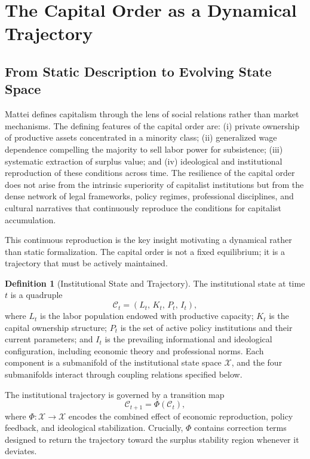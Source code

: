 \documentclass[12pt,a4paper]{article}
\theoremstyle{definition}
\newtheorem{definition}{Definition}[section]
\theoremstyle{remark}
\begin{document}
\section{The Capital Order as a Dynamical Trajectory}
\label{sec:historical}

\subsection{From Static Description to Evolving State Space}

Mattei defines capitalism through the lens of social relations rather than market mechanisms. The defining features of the capital order are: (i) private ownership of productive assets concentrated in a minority class; (ii) generalized wage dependence compelling the majority to sell labor power for subsistence; (iii) systematic extraction of surplus value; and (iv) ideological and institutional reproduction of these conditions across time. The resilience of the capital order does not arise from the intrinsic superiority of capitalist institutions but from the dense network of legal frameworks, policy regimes, professional disciplines, and cultural narratives that continuously reproduce the conditions for capitalist accumulation.

This continuous reproduction is the key insight motivating a dynamical rather than static formalization. The capital order is not a fixed equilibrium; it is a trajectory that must be actively maintained.

\begin{definition}[Institutional State and Trajectory]
The institutional state at time $t$ is a quadruple
\begin{equation}
  \mathcal{C}_t = (L_t,\, K_t,\, P_t,\, I_t),
\end{equation}
where $L_t$ is the labor population endowed with productive capacity; $K_t$ is the capital ownership structure; $P_t$ is the set of active policy institutions and their current parameters; and $I_t$ is the prevailing informational and ideological configuration, including economic theory and professional norms. Each component is a submanifold of the institutional state space $\mathcal{X}$, and the four submanifolds interact through coupling relations specified below.

The institutional trajectory is governed by a transition map
\begin{equation}
  \label{eq:transition}
  \mathcal{C}_{t+1} = \Phi(\mathcal{C}_t),
\end{equation}
where $\Phi : \mathcal{X} \to \mathcal{X}$ encodes the combined effect of economic reproduction, policy feedback, and ideological stabilization. Crucially, $\Phi$ contains correction terms designed to return the trajectory toward the surplus stability region whenever it deviates.
\end{definition}
\end{document}
